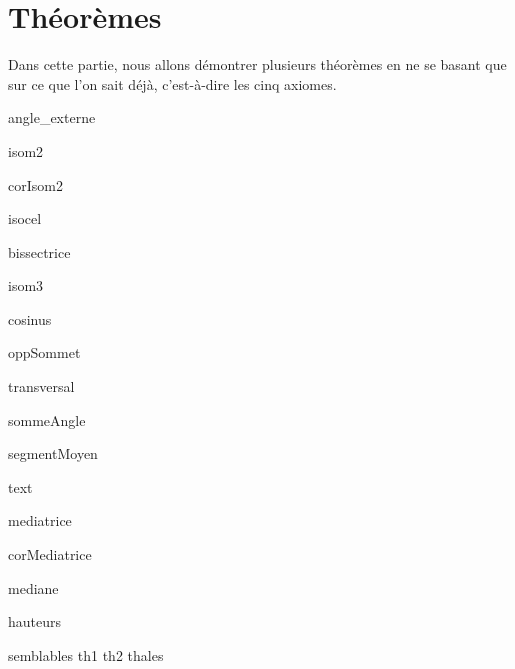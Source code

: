 \documentclass[a4paper,12pt]{article}
\begin{document}
\section{Théorèmes}
Dans cette partie, nous allons démontrer plusieurs théorèmes en ne se basant que sur ce que l'on sait déjà, c'est-à-dire les cinq axiomes.

{angle_externe}

{isom2}

{corIsom2}

{isocel}

{bissectrice}

{isom3}

{cosinus}

{oppSommet}

{transversal}

{sommeAngle}

{segmentMoyen}

{text}

{mediatrice}
 
{corMediatrice}

{mediane}

{hauteurs}

{semblables}
{th1}
{th2}
{thales}
\end{document}
